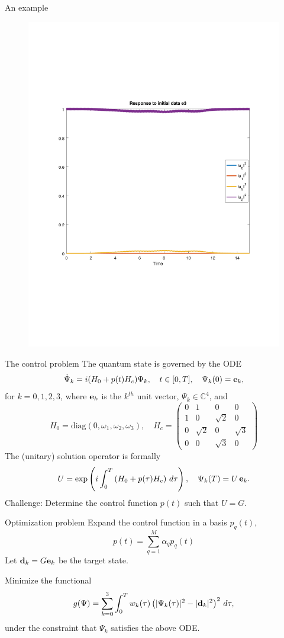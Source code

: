 \documentclass{beamer}
\newcommand{\db}{{\bf d}}
\newcommand{\eb}{{\bf e}}
\begin{document}
\begin{frame}{An example}
\begin{figure}
    \includegraphics[width=0.45\linewidth]{resp3.pdf}
  \end{figure}
\end{frame}

\begin{frame}{The control problem}
 The quantum state is governed by the ODE
  \[
  \dot{\Psi}_k = i(H_0 + p(t)H_c)\Psi_k,\quad
  t\in[0,T], \quad \Psi_k(0) = \eb_k,
  \]
  for $k=0,1,2,3$, where $\eb_k$ is the $k^{th}$ unit vector, $\Psi_k \in {\mathbb C}^4$, and 
  \[
  H_0=\mbox{diag$(0, \omega_1, \omega_2, \omega_3)$},\quad
  H_c=\begin{pmatrix}
  0 & 1 & 0 & 0 \\
  1 & 0 & \sqrt{2} & 0\\
  0 & \sqrt{2} & 0 & \sqrt{3} \\
  0 & 0 & \sqrt{3}& 0
  \end{pmatrix}
  \]
  The (unitary) solution operator is formally
  \[
  U = \exp\left(i \int_0^T\left(H_0 + p(\tau)H_c\right)\,d\tau\right),\quad
%
  \Psi_k(T) = U\, \eb_k.
  \]
  Challenge: Determine the control function $p(t)$ such that $U=G$.
\end{frame}

\begin{frame}{Optimization problem}
  Expand the control function in a basis $p_q(t)$,
  \[
  p(t) = \sum_{q=1}^M \alpha_q p_q(t)
  \]
  Let $\db_k=G\eb_k$ be the target state.

  Minimize the functional
  \[
  g(\Psi) = \sum_{k=0}^3 \int_0^T w_k(\tau) \left( |\Psi_k(\tau)|^2 -
  |\db_k|^2\right)^2\, d\tau,
  \]
  under the constraint that $\Psi_k$ satisfies the above ODE.
\end{frame}
\end{document}
